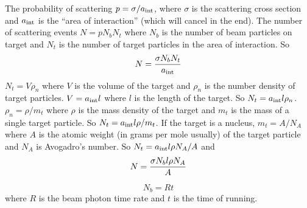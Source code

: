 \documentclass{article}
\begin{document}
The probability of scattering $p = \sigma/a_{\rm int}$, where $\sigma$ is the scattering cross section and $a_{\rm int}$ is the ``area of interaction'' (which will cancel in the end). The number of scattering events $N=pN_bN_t$ where $N_b$ is the number of beam particles on target and $N_t$ is the number of target particles in the area of interaction. So
$$
N = {\sigma N_b N_t \over a_{\rm int}}
$$
  $N_t = V\rho_n$ where $V$ is the volume of the target and $\rho_n$ is the number density of target particles. $V=a_{\rm int}l$ where $l$ is the length of the target. So $N_t = a_{\rm int}l\rho_n$. $\rho_n = \rho/m_t$ where $\rho$ is the mass density of the target and $m_t$ is the mass of a single target particle. So $N_t = a_{\rm int}l\rho/m_t$. If the target is a nucleus, $m_t = A/N_A$ where $A$ is the atomic weight (in grams per mole usually) of the target particle and $N_A$ is Avogadro's number. So $N_t = a_{\rm int}l\rho N_A/A$ and 
$$
N = {\sigma N_b l \rho N_A \over A}
$$

$$
N_b = Rt
$$
where $R$ is the beam photon time rate and $t$ is the time of running.
  
  
\end{document}
